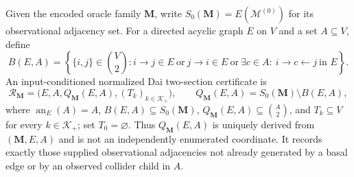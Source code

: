 Given the encoded oracle family \(\mathbf M\), write \(S_0(\mathbf M)=E(\mathcal M^{(0)})\) for its observational adjacency set.  For a directed acyclic graph \(E\) on \(V\) and a set \(A\subseteq V\), define
\[
B(E,A)=\left\{\{i,j\}\in\binom V2:
i\to j\in E\ \text{or}\ j\to i\in E\ \text{or}\
\exists c\in A:\ i\to c\leftarrow j\ \text{in }E
\right\}.
\]
An input-conditioned normalized Dai two-section certificate is
\[
\mathcal R_{\mathbf M}=\bigl(E,A,Q_{\mathbf M}(E,A),(T_k)_{k\in\mathcal K_+}\bigr),
\qquad
Q_{\mathbf M}(E,A)=S_0(\mathbf M)\setminus B(E,A),
\]
where \(\operatorname{an}_E(A)=A\), \(B(E,A)\subseteq S_0(\mathbf M)\), \(Q_{\mathbf M}(E,A)\subseteq\binom A2\), and \(T_k\subseteq V\) for every \(k\in\mathcal K_+\); set \(T_0=\varnothing\).  Thus \(Q_{\mathbf M}(E,A)\) is uniquely derived from \((\mathbf M,E,A)\) and is not an independently enumerated coordinate.  It records exactly those supplied observational adjacencies not already generated by a basal edge or by an observed collider child in \(A\).